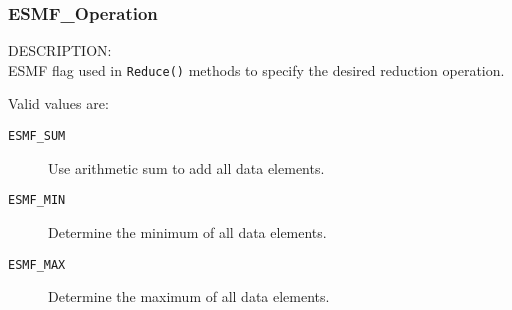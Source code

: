 
\subsubsection{ESMF\_Operation}

{\sf DESCRIPTION:\\}
ESMF flag used in {\tt Reduce()} methods to specify the desired reduction operation.

Valid values are:
\begin{description}
   \item [{\tt ESMF\_SUM}]
         Use arithmetic sum to add all data elements.
   \item [{\tt ESMF\_MIN}]
         Determine the minimum of all data elements.
   \item [{\tt ESMF\_MAX}]
         Determine the maximum of all data elements.
\end{description}
